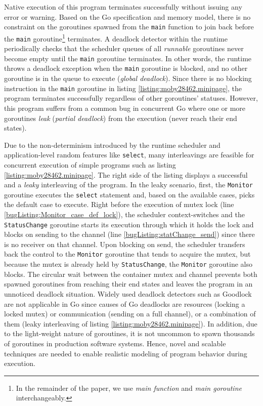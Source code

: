 Native execution of this program terminates successfully without issuing any error or warning.
%
Based on the Go specification and memory model, there is no constraint on the goroutines spawned from the \texttt{main} function to join back before the \texttt{main} goroutine\footnote{In the remainder of the paper, we use \textit{main function} and \textit{main goroutine} interchangeably.} terminates.
%
A deadlock detector within the runtime periodically checks that the scheduler queues of all \textit{runnable} goroutines never become empty until the \texttt{main} goroutine terminates.
%
In other words, the runtime throws a deadlock exception when the \texttt{main} goroutine is blocked, and no other goroutine is in the queue to execute (\ie \textit{global deadlock}).
%
Since there is no blocking instruction in the \texttt{main} goroutine in listing \ref{listing:moby28462.minipage}, the program terminates successfully regardless of other goroutines' statuses.
%
However, this program suffers from a common bug in concurrent Go where one or more goroutines \textit{leak} (\ie \textit{partial deadlock}) from the execution (\ie never reach their end states).

Due to the non-determinism introduced by the runtime scheduler and application-level random features like \texttt{select}, many interleavings are feasible for concurrent execution of simple programs such as listing \ref{listing:moby28462.minipage}.
%
The right side of the listing displays a successful and a \textit{leaky} interleaving of the program.
%
In the leaky scenario, first, the \texttt{Monitor} goroutine executes the \texttt{select} statement and, based on the available cases, picks the default case to execute.
%
Right before the execution of mutex lock (line \ref{bugListing:Monitor_case_def_lock}), the scheduler context-switches and the \texttt{StatusChange} goroutine starts its execution through which it holds the lock and blocks on sending to the channel (line \ref{bugListing:statChange_send}) since there is no receiver on that channel.
%
Upon blocking on send, the scheduler transfers back the control to the \texttt{Monitor} goroutine that tends to acquire the mutex, but because the mutex is already held by \texttt{StatusChange}, the \texttt{Monitor} goroutine also blocks.
%
The circular wait between the container mutex and channel prevents both spawned goroutines from reaching their end states and leaves the program in an unnoticed deadlock situation.
%
Widely used deadlock detectors such as Goodlock \cite{havelund-goodlock-spin00} are not applicable in Go since causes of Go deadlocks are resources (\eg locking a locked mutex) or communication (\eg sending on a full channel), or a combination of them (\eg leaky interleaving of listing \ref{listing:moby28462.minipage}).
%
In addition, due to the light-weight nature of goroutines, it is not uncommon to spawn thousands of goroutines in production software systems.
%
Hence,  novel and scalable techniques are needed to enable realistic modeling of program behavior during execution.
%



